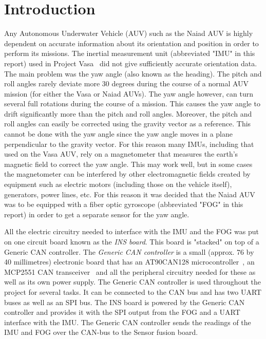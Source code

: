\section{Introduction}\label{sec:introduction}
Any Autonomous Underwater Vehicle (AUV) such as the Naiad AUV is highly dependent on accurate information about its orientation and position in order to perform its missions. The inertial measurement unit (abbreviated "IMU" in this report) used in Project Vasa~\cite{unpublished:vasa} did not give sufficiently accurate orientation data. The main problem was the yaw angle (also known as the heading). \newline
The pitch and roll angles rarely deviate more 30 degrees during the course of a normal AUV mission (for either the Vasa or Naiad AUVs). The yaw angle however, can turn several full rotations during the course of a mission. This causes the yaw angle to drift significantly more than the pitch and roll angles. Moreover, the pitch and roll angles can easily be corrected using the gravity vector as a reference. This cannot be done with the yaw angle since the yaw angle moves in a plane perpendicular to the gravity vector. \newline
For this reason many IMUs, including that used on the Vasa AUV, rely on a magnetometer that measures the earth's magnetic field to correct the yaw angle. This may work well, but in some cases the magnetometer can be interfered by other electromagnetic fields created by equipment such as electric motors (including those on the vehicle itself), generators, power lines, etc. For this reason it was decided that the Naiad AUV was to be equipped with a fiber optic gyroscope (abbreviated "FOG" in this report) in order to get a separate sensor for the yaw angle.

All the electric circuitry needed to interface with the IMU and the FOG was put on one circuit board known as the \emph{INS board}. This board is "stacked" on top of a Generic CAN controller. The \emph{Generic CAN controller} is a small (approx. 76 by 40 millimetres) electronic board that has an AT90CAN128 microcontroller~\cite{web:at90can}, an MCP2551 CAN transceiver~\cite{web:mcp2551} and all the peripheral circuitry needed for these as well as its own power supply. The Generic CAN controller is used throughout the project for several tasks. It can be connected to the CAN bus and has two UART buses as well as an SPI bus. \newline
The INS board is powered by the Generic CAN controller and provides it with the SPI output from the FOG and a UART interface with the IMU. The Generic CAN controller sends the readings of the IMU and FOG over the CAN-bus to the Sensor fusion board.
